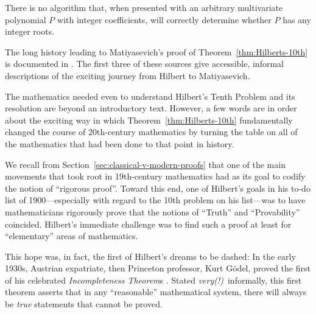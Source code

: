 \bigskip

\begin{theorem}
\label{thm:Hilberts-10th}
There is no algorithm that, when presented with an arbitrary multivariate polynomial $P$ with integer coefficients, will correctly determine whether $P$ has any integer roots.
\end{theorem}

The long history leading to Matiyasevich's proof of Theorem~\ref{thm:Hilberts-10th} is documented in \cite{Davis73,DavisH73,DavisMR76,Matiyasevich93}.  The first three of these sources give accessible, informal descriptions of the exciting journey from Hilbert to Matiyasevich.

\medskip

The mathematics needed even to understand Hilbert's Tenth Problem and its resolution are beyond an introductory text.  However, a few words are in order about the exciting way in which Theorem~\ref{thm:Hilberts-10th} fundamentally changed the course of 20th-century mathematics by turning the table on all of the mathematics that had been done to that point in history.

\medskip

We recall from Section~\ref{sec:classical-v-modern-proofs} that one of the main movements that took root in 19th-century mathematics had as its goal to codify the notion of ``rigorous proof''.  Toward this end, one of Hilbert's goals in his to-do list of 1900---especially with regard to the 10th problem on his list---was to have mathematicians rigorously prove that the notions of ``Truth'' and ``Provability'' coincided.  Hilbert's immediate challenge was to find such a proof at least for ``elementary'' areas of mathematics.

\smallskip

 

This hope was, in fact, the first of Hilbert's dreams to be dashed: In the early 1930s, Austrian expatriate, then Princeton professor, Kurt G\"{o}del, proved the first of his celebrated {\it Incompleteness Theorem}s \cite{Goedel31}.  Stated {\em very(!)}~informally, this first theorem asserts that in any ``reasonable'' mathematical system, there will always be {\em true} statements that cannot be proved.

\bigskip

